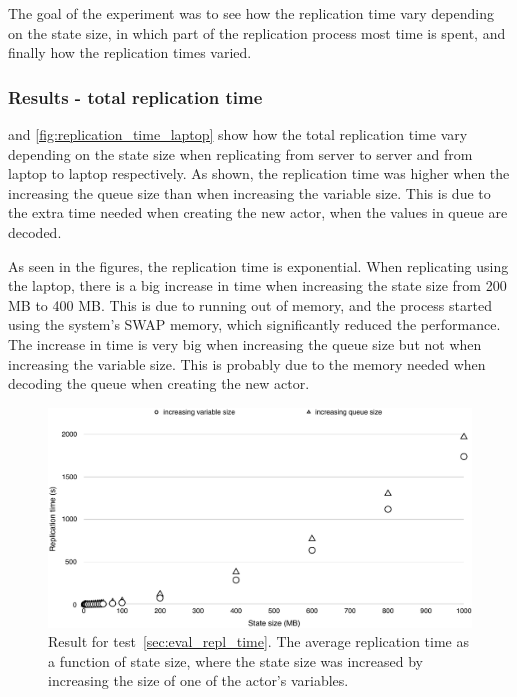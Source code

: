 \documentclass{cslthse-msc}
\begin{document}
The goal of the experiment was to see how the replication time vary depending on the state size, in which part of the replication process most time is spent, and finally how the replication times varied.

\subsubsection*{Results - total replication time}
 and \cref{fig:replication_time_laptop} show how the total replication time vary depending on the state size when replicating from server to server and from laptop to laptop respectively. As shown, the replication time was higher when the increasing the queue size than  when increasing the variable size. This is due to the extra time needed when creating the new actor, when the values in queue are decoded. %

As seen in the figures, the replication time is exponential. When replicating using the laptop, there is a big increase in time when increasing the state size from 200 MB to 400 MB. This is due to running out of memory, and the process started using the system's SWAP memory, which significantly reduced the performance. The increase in time is very big when increasing the queue size but not when increasing the variable size. This is probably due to the memory needed when decoding the queue when creating the new actor.

\begin{figure}[hbt!]
\centering
\includegraphics[scale=0.5]{images/results/replication_time/server.pdf} 
\caption{Result for test~\ref{sec:eval_repl_time}. The average replication time as a function of state size, where the state size was increased by increasing the size of one of the actor's variables.} \label{fig:replication_time_server}
\end{figure}
\end{document}
